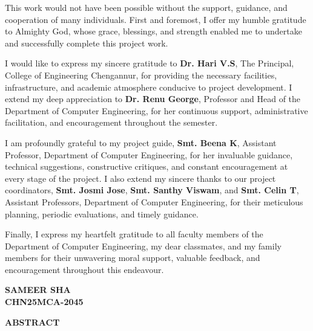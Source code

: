 \documentclass[a4paper,12pt]{report}
\newcommand{\studentname}{SAMEER SHA}
\newcommand{\rollno}{CHN25MCA-2045}
\newcommand{\guidename}{Smt. Beena K}
\begin{document}
	\noindent This work would not have been possible without the support, guidance, and cooperation of many individuals. First and foremost, I offer my humble gratitude to Almighty God, whose grace, blessings, and strength enabled me to undertake and successfully complete this project work.
	
	I would like to express my sincere gratitude to \textbf{Dr. Hari V.S}, The Principal, College of Engineering Chengannur, for providing the necessary facilities, infrastructure, and academic atmosphere conducive to project development. I extend my deep appreciation to \textbf{Dr. Renu George}, Professor and Head of the Department of Computer Engineering, for her continuous support, administrative facilitation, and encouragement throughout the semester.
	
	I am profoundly grateful to my project guide, \textbf{\guidename}, Assistant Professor, Department of Computer Engineering, for her invaluable guidance, technical suggestions, constructive critiques, and constant encouragement at every stage of the project. I also extend my sincere thanks to our project coordinators, \textbf{Smt. Josmi Jose}, \textbf{Smt. Santhy Viswam}, and \textbf{Smt. Celin T}, Assistant Professors, Department of Computer Engineering, for their meticulous planning, periodic evaluations, and timely guidance.
	
	Finally, I express my heartfelt gratitude to all faculty members of the Department of Computer Engineering, my dear classmates, and my family members for their unwavering moral support, valuable feedback, and encouragement throughout this endeavour.
	
	\begin{flushright}
		\textbf{\studentname\\\rollno}
	\end{flushright}
	\clearpage
	
	\begin{center}
		\Large\textbf{ABSTRACT}
	\end{center}
	\vspace{1cm}
	
\end{document}
